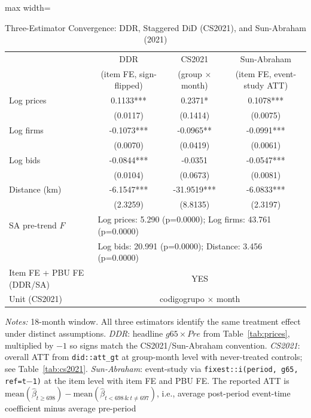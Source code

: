 \begin{table}[htbp]
\centering
\caption{Three-Estimator Convergence: DDR, Staggered DiD (CS2021), and Sun-Abraham (2021)}
\label{tab:sunab}
\begin{adjustbox}{max width=\textwidth}
\begin{threeparttable}
\small
\begin{tabular}{lccc}
\toprule
 & DDR & CS2021 & Sun-Abraham \\
 & (item FE, sign-flipped) & (group $\times$ month) & (item FE, event-study ATT) \\
\midrule
Log prices & 0.1133*** & 0.2371* & 0.1078*** \\
 & (0.0117) & (0.1414) & (0.0075) \\
Log firms & -0.1073*** & -0.0965** & -0.0991*** \\
 & (0.0070) & (0.0419) & (0.0061) \\
Log bids & -0.0844*** & -0.0351 & -0.0547*** \\
 & (0.0104) & (0.0673) & (0.0081) \\
Distance (km) & -6.1547*** & -31.9519*** & -6.0833*** \\
 & (2.3259) & (8.8135) & (2.3197) \\
\midrule
SA pre-trend $F$ & \multicolumn{3}{l}{Log prices: 5.290 (p=0.0000); Log firms: 43.761 (p=0.0000)} \\
 & \multicolumn{3}{l}{Log bids: 20.991 (p=0.0000); Distance: 3.456 (p=0.0000)} \\
Item FE + PBU FE (DDR/SA) & \multicolumn{3}{c}{YES} \\
Unit (CS2021) & \multicolumn{3}{c}{codigogrupo $\times$ month} \\
\bottomrule
\end{tabular}
\begin{tablenotes}
\small
\item \textit{Notes:} 18-month window. All three estimators identify the
same treatment effect under distinct assumptions.
\textit{DDR}: headline $g65 \times Pre$ from Table~\ref{tab:prices}, multiplied
by $-1$ so signs match the CS2021/Sun-Abraham convention.
\textit{CS2021}: overall ATT from \texttt{did::att\_gt} at group-month level
with never-treated controls; see Table~\ref{tab:cs2021}.
\textit{Sun-Abraham}: event-study via \texttt{fixest::i(period, g65, ref=t$-$1)}
at the item level with item FE and PBU FE. The reported ATT is
$\mathrm{mean}(\hat\beta_{t\geq 698}) - \mathrm{mean}(\hat\beta_{t<698\,\&\,t\neq 697})$,
i.e., average post-period event-time coefficient minus average pre-period

\end{tablenotes}
\end{threeparttable}
\end{adjustbox}
\end{table}
